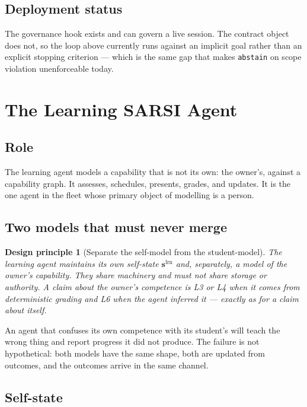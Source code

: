 \documentclass[11pt]{article}
\newtheorem{principle}{Design principle}
\newcommand{\code}[1]{\texttt{\small #1}}
\begin{document}
\subsection{Deployment status}

The governance hook exists and can govern a live session. The contract object does not, so the loop above currently runs against an implicit goal rather than an explicit stopping criterion --- which is the same gap that makes \code{abstain} on scope violation unenforceable today.

\section{The Learning SARSI Agent}
\label{sec:learning}

\subsection{Role}

The learning agent models a capability that is not its own: the owner's, against a capability graph. It assesses, schedules, presents, grades, and updates. It is the one agent in the fleet whose primary object of modelling is a person.

\subsection{Two models that must never merge}

\begin{principle}[Separate the self-model from the student-model]
\label{prin:twomodels}
The learning agent maintains its own self-state $\mathbf{s}^{\mathrm{lrn}}$ and, separately, a model of the owner's capability. They share machinery and must not share storage or authority. A claim about the owner's competence is L3 or L4 when it comes from deterministic grading and L6 when the agent inferred it --- exactly as for a claim about itself.
\end{principle}

An agent that confuses its own competence with its student's will teach the wrong thing and report progress it did not produce. The failure is not hypothetical: both models have the same shape, both are updated from outcomes, and the outcomes arrive in the same channel.

\subsection{Self-state}
\end{document}
